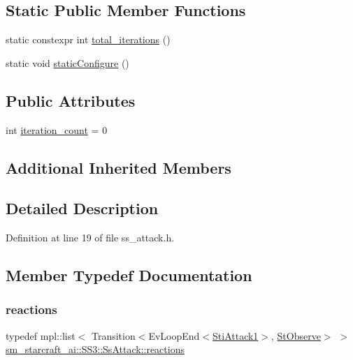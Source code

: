 \subsection*{Static Public Member Functions}
\begin{DoxyCompactItemize}
\item 
static constexpr int \hyperlink{structsm__starcraft__ai_1_1SS3_1_1SsAttack_acfe70ebd3a2b1ea73f7b2bf96ec14068}{total\+\_\+iterations} ()
\item 
static void \hyperlink{structsm__starcraft__ai_1_1SS3_1_1SsAttack_ad286529f2e2f0c40f3e74ccaf34e4376}{static\+Configure} ()
\end{DoxyCompactItemize}
\subsection*{Public Attributes}
\begin{DoxyCompactItemize}
\item 
int \hyperlink{structsm__starcraft__ai_1_1SS3_1_1SsAttack_ac3c4cbd10c7b25de8649d8b029e916f1}{iteration\+\_\+count} = 0
\end{DoxyCompactItemize}
\subsection*{Additional Inherited Members}


\subsection{Detailed Description}


Definition at line 19 of file ss\+\_\+attack.\+h.



\subsection{Member Typedef Documentation}
\mbox{\label{structsm__starcraft__ai_1_1SS3_1_1SsAttack_a3b31f484f8db42bd131288e2616a1006}} 
\subsubsection{\texorpdfstring{reactions}{reactions}}
{\footnotesize\ttfamily typedef mpl\+::list$<$ Transition$<$Ev\+Loop\+End$<$\hyperlink{structsm__starcraft__ai_1_1attack__inner__states_1_1StiAttack1}{Sti\+Attack1}$>$, \hyperlink{structsm__starcraft__ai_1_1StObserve}{St\+Observe}$>$ $>$ \hyperlink{structsm__starcraft__ai_1_1SS3_1_1SsAttack_a3b31f484f8db42bd131288e2616a1006}{sm\+\_\+starcraft\+\_\+ai\+::\+S\+S3\+::\+Ss\+Attack\+::reactions}}



